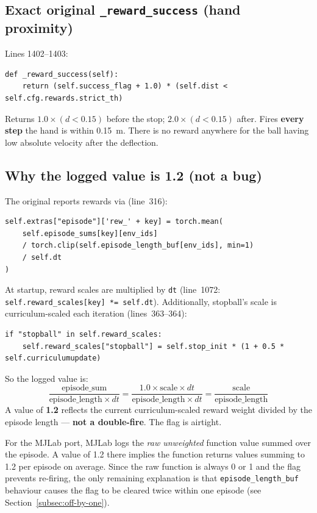 \documentclass[11pt,a4paper]{article}
\begin{document}
\subsection{Exact original \texttt{\_reward\_success} (hand proximity)}

Lines 1402--1403:
\begin{lstlisting}[caption={Original hand proximity reward}]
def _reward_success(self):
    return (self.success_flag + 1.0) * (self.dist < self.cfg.rewards.strict_th)
\end{lstlisting}

Returns $1.0 \times (d < 0.15)$ before the stop; $2.0 \times (d < 0.15)$ after.
Fires \textbf{every step} the hand is within 0.15~m. There is no reward anywhere
for the ball having low absolute velocity after the deflection.

\subsection{Why the logged value is 1.2 (not a bug)}

The original reports rewards via (line~316):
\begin{lstlisting}[caption={Isaac Gym reward logging (legged\_robot.py:316)}]
self.extras["episode"]['rew_' + key] = torch.mean(
    self.episode_sums[key][env_ids]
    / torch.clip(self.episode_length_buf[env_ids], min=1)
    / self.dt
)
\end{lstlisting}

At startup, reward scales are multiplied by \texttt{dt} (line~1072:
\texttt{self.reward\_scales[key] *= self.dt}).
Additionally, stopball's scale is curriculum-scaled each iteration (lines~363--364):
\begin{lstlisting}
if "stopball" in self.reward_scales:
    self.reward_scales["stopball"] = self.stop_init * (1 + 0.5 * self.curriculumupdate)
\end{lstlisting}

So the logged value is:
\[
  \frac{\text{episode\_sum}}{\text{episode\_length} \times dt}
  = \frac{1.0 \times \text{scale} \times dt}{\text{episode\_length} \times dt}
  = \frac{\text{scale}}{\text{episode\_length}}
\]
A value of \textbf{1.2} reflects the current curriculum-scaled reward weight
divided by the episode length --- \textbf{not a double-fire}. The flag is
airtight.

For the MJLab port, MJLab logs the \emph{raw unweighted} function value summed
over the episode. A value of 1.2 there implies the function returns values
summing to 1.2 per episode on average. Since the raw function is always 0 or 1
and the flag prevents re-firing, the only remaining explanation is that
\texttt{episode\_length\_buf} behaviour causes the flag to be cleared twice
within one episode (see Section~\ref{subsec:off-by-one}).
\end{document}
